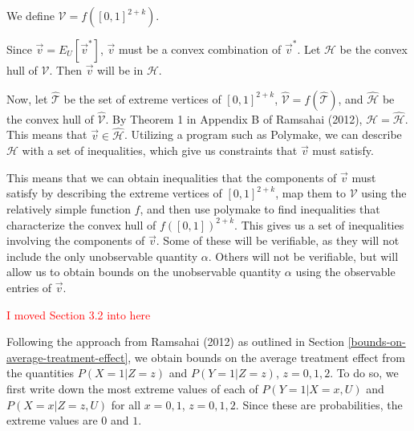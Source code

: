 \documentclass[
]{article}
\theoremstyle{plain}
\begin{document}
{We define \(\mathcal{V} = f([0,1]^{2+k})\).

Since \(\vec{v} = E_U[\vec{v}^*]\), \(\vec{v}\) must be a convex combination of \(\vec{v}^*\). Let \(\mathcal{H}\) be the convex hull of \(\mathcal{V}\). Then \(\vec{v}\) will be in \(\mathcal{H}\).

Now, let \(\hat{\mathcal{T}}\) be the set of extreme vertices of \([0,1]^{2+k}\), \(\hat{\mathcal{V}} = f(\hat{\mathcal{T}})\), and \(\hat{\mathcal{H}}\) be the convex hull of \(\hat{\mathcal{V}}\). By Theorem 1 in Appendix B of Ramsahai (2012), \(\mathcal{H} = \mathcal{\hat{H}}\). This means that \(\vec{v} \in \mathcal{\hat{H}}\). Utilizing a program such as Polymake, we can describe \(\mathcal{H}\) with a set of inequalities, which give us constraints that \(\vec{v}\) must satisfy.

This means that we can obtain inequalities that the components of \(\vec{v}\) must satisfy by describing the extreme vertices of \([0,1]^{2+k}\), map them to \(\mathcal{V}\) using the relatively simple function \(f\), and then use polymake to find inequalities that characterize the convex hull of \(f([0,1])^{2+k}\). This gives us a set of inequalities involving the components of \(\vec{v}\). Some of these will be verifiable, as they will not include the only unobservable quantity \(\alpha\). Others will not be verifiable, but will allow us to obtain bounds on the unobservable quantity \(\alpha\) using the observable entries of \(\vec{v}\).


\textcolor{red}{I moved Section 3.2 into here}

Following the approach from Ramsahai (2012) as outlined in Section \ref{bounds-on-average-treatment-effect}, we obtain bounds on the average treatment effect from the quantities \(P(X = 1 | Z = z)\) and \(P(Y = 1 | Z = z)\), \(z = 0,1,2\). To do so, we first write down the most extreme values of each of \(P(Y = 1 | X = x, U)\) and \(P(X = x | Z = z, U)\) for all \(x=0,1\), \(z=0,1,2\). Since these are probabilities, the extreme values are \(0\) and \(1\).

}
\end{document}
